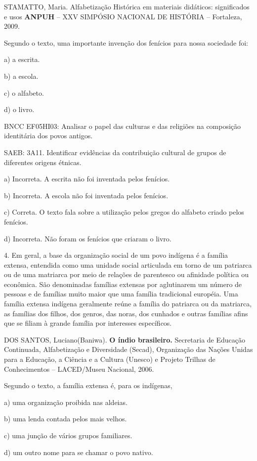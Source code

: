 STAMATTO, Maria. Alfabetização Histórica em materiais didáticos:
significados e usos \textbf{ANPUH} -- XXV SIMPÓSIO NACIONAL DE HISTÓRIA
-- Fortaleza, 2009.

Segundo o texto, uma importante invenção dos fenícios para nossa
sociedade foi:

a) a escrita.

b) a escola.

c) o alfabeto.

d) o livro.

BNCC EF05HI03: Analisar o papel das culturas e das religiões na
composição identitária dos povos antigos.

SAEB: 3A11. Identificar evidências da contribuição cultural de grupos de
diferentes origens étnicas.

a) Incorreta. A escrita não foi inventada pelos fenícios.

b) Incorreta. A escola não foi inventada pelos fenícios.

c) Correta. O texto fala sobre a utilização pelos gregos do alfabeto
criado pelos fenícios.

d) Incorreta. Não foram os fenícios que criaram o livro.

4. Em geral, a base da organização social de um povo indígena é a
família extensa, entendida como uma unidade social articulada em torno
de um patriarca ou de uma matriarca por meio de relações de parentesco
ou afinidade política ou econômica. São denominadas famílias extensas
por aglutinarem um número de pessoas e de famílias muito maior que uma
família tradicional européia. Uma família extensa indígena geralmente
reúne a família do patriarca ou da matriarca, as famílias dos filhos,
dos genros, das noras, dos cunhados e outras famílias afins que se
filiam à grande família por interesses específicos.

DOS SANTOS, Luciano(Baniwa). \textbf{O índio brasileiro.} Secretaria de
Educação Continuada, Alfabetização e Diversidade (Secad), Organização
das Nações Unidas para a Educação, a Ciência e a Cultura (Unesco) e
Projeto Trilhas de Conhecimentos -- LACED/Museu Nacional, 2006.

Segundo o texto, a família extensa é, para os indígenas,

a) uma organização proibida nas aldeias.

b) uma lenda contada pelos mais velhos.

c) uma junção de vários grupos familiares.

d) um outro nome para se chamar o povo nativo.

